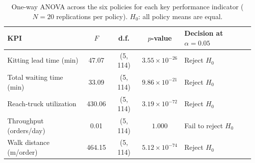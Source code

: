 \begin{table}[htbp]
\centering
\caption{One-way ANOVA across the six policies for each key performance indicator
($N=20$ replications per policy). $H_0$: all policy means are equal.}
\label{tab:anova}
\small
\begin{tabular}{lcccl}
\toprule
KPI & $F$ & d.f. & $p$-value & Decision at $\alpha=0.05$ \\
\midrule
Kitting lead time (min) & 47.07 & (5, 114) & $3.55 \times 10^{-26}$ & Reject $H_0$ \\
Total waiting time (min) & 33.09 & (5, 114) & $9.86 \times 10^{-21}$ & Reject $H_0$ \\
Reach-truck utilization & 430.06 & (5, 114) & $3.19 \times 10^{-72}$ & Reject $H_0$ \\
Throughput (orders/day) & 0.01 & (5, 114) & $1.000$ & Fail to reject $H_0$ \\
Walk distance (m/order) & 464.15 & (5, 114) & $5.12 \times 10^{-74}$ & Reject $H_0$ \\
\bottomrule
\end{tabular}
\end{table}
